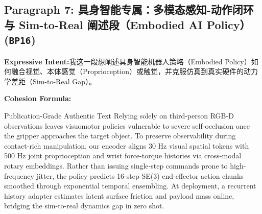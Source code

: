 \subsection*{Paragraph 7: 具身智能专属：多模态感知-动作闭环与 Sim-to-Real 阐述段（Embodied AI Policy） (\texttt{BP16})}
\noindent\textbf{Expressive Intent:}\enspace 我这一段想阐述具身智能机器人策略（Embodied Policy）如何融合视觉、本体感觉（Proprioception）或触觉，并克服仿真到真实硬件的动力学差距（Sim-to-Real Gap）。\par
\noindent\textbf{Cohesion Formula:}\par\vspace{4pt}
\begin{ExampleBox}{Publication-Grade Authentic Text}
Relying solely on third-person RGB-D observations leaves visuomotor policies vulnerable to severe self-occlusion once the gripper approaches the target object. To preserve observability during contact-rich manipulation, our encoder aligns 30 Hz visual spatial tokens with 500 Hz joint proprioception and wrist force-torque histories via cross-modal rotary embeddings. Rather than issuing single-step commands prone to high-frequency jitter, the policy predicts 16-step SE(3) end-effector action chunks smoothed through exponential temporal ensembling. At deployment, a recurrent history adapter estimates latent surface friction and payload mass online, bridging the sim-to-real dynamics gap in zero shot.
\end{ExampleBox}
